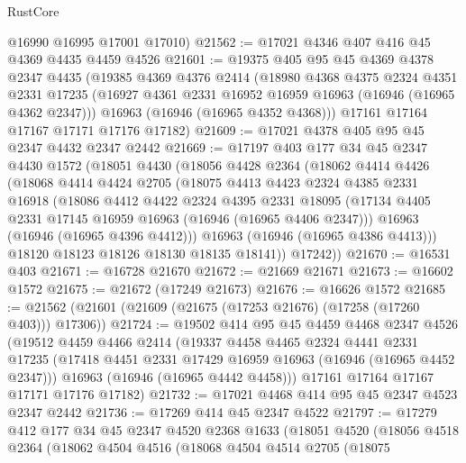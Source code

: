 \begin{lexlean}{RustCore}
\begin{coremodule}
      @16990
      @16995
      @17001
      @17010)
@21562 := @17021 @4346 @407 @416 @45 @4369 @4435 @4459 @4526
@21601 := @19375
    @405
    @95
    @45
    @4369
    @4378
    @2347
    @4435
    (@19385
      @4369
      @4376
      @2414
      (@18980
        @4368
        @4375
        @2324
        @4351
        @2331
        @17235
        (@16927 @4361 @2331 @16952 @16959 @16963 (@16946 (@16965 @4362 @2347)))
        @16963
        (@16946 (@16965 @4352 @4368)))
      @17161
      @17164
      @17167
      @17171
      @17176
      @17182)
@21609 := @17021 @4378 @405 @95 @45 @2347 @4432 @2347 @2442
@21669 := @17197
    @403
    @177
    @34
    @45
    @2347
    @4430
    @1572
    (@18051
      @4430
      (@18056
        @4428
        @2364
        (@18062
          @4414
          @4426
          (@18068
            @4414
            @4424
            @2705
            (@18075
              @4413
              @4423
              @2324
              @4385
              @2331
              @16918
              (@18086
                @4412
                @4422
                @2324
                @4395
                @2331
                @18095
                (@17134 @4405 @2331 @17145 @16959 @16963 (@16946 (@16965 @4406 @2347)))
                @16963
                (@16946 (@16965 @4396 @4412)))
              @16963
              (@16946 (@16965 @4386 @4413)))
            @18120
            @18123
            @18126
            @18130
            @18135
            @18141))
        @17242))
@21670 := @16531 @403
@21671 := @16728 @21670
@21672 := @21669 @21671
@21673 := @16602 @1572
@21675 := @21672 (@17249 @21673)
@21676 := @16626 @1572
@21685 := @21562 (@21601 (@21609 (@21675 (@17253 @21676) (@17258 (@17260 @403))) @17306))
@21724 := @19502
    @414
    @95
    @45
    @4459
    @4468
    @2347
    @4526
    (@19512
      @4459
      @4466
      @2414
      (@19337
        @4458
        @4465
        @2324
        @4441
        @2331
        @17235
        (@17418 @4451 @2331 @17429 @16959 @16963 (@16946 (@16965 @4452 @2347)))
        @16963
        (@16946 (@16965 @4442 @4458)))
      @17161
      @17164
      @17167
      @17171
      @17176
      @17182)
@21732 := @17021 @4468 @414 @95 @45 @2347 @4523 @2347 @2442
@21736 := @17269 @414 @45 @2347 @4522
@21797 := @17279
    @412
    @177
    @34
    @45
    @2347
    @4520
    @2368
    @1633
    (@18051
      @4520
      (@18056
        @4518
        @2364
        (@18062
          @4504
          @4516
          (@18068
            @4504
            @4514
            @2705
            (@18075

\end{coremodule}
\end{lexlean}
